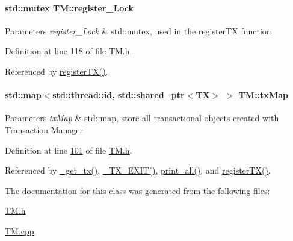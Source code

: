 \paragraph[{\texorpdfstring{register\+\_\+\+Lock}{register_Lock}}]{\setlength{\rightskip}{0pt plus 5cm}std\+::mutex T\+M\+::register\+\_\+\+Lock\hspace{0.3cm}{\ttfamily [private]}}\hypertarget{class_t_m_aeb26546681bfe64e21606b8c012bb8c3_aeb26546681bfe64e21606b8c012bb8c3}{}\label{class_t_m_aeb26546681bfe64e21606b8c012bb8c3_aeb26546681bfe64e21606b8c012bb8c3}

\begin{DoxyParams}{Parameters}
{\em register\+\_\+\+Lock} & std\+::mutex, used in the register\+TX function \\
\hline
\end{DoxyParams}


Definition at line \hyperlink{_t_m_8h_source_l00118}{118} of file \hyperlink{_t_m_8h_source}{T\+M.\+h}.



Referenced by \hyperlink{_t_m_8cpp_source_l00043}{register\+T\+X()}.

\paragraph[{\texorpdfstring{tx\+Map}{txMap}}]{\setlength{\rightskip}{0pt plus 5cm}std\+::map$<$std\+::thread\+::id, std\+::shared\+\_\+ptr$<${\bf TX}$>$ $>$ T\+M\+::tx\+Map\hspace{0.3cm}{\ttfamily [private]}}\hypertarget{class_t_m_a0333dfa193ea99d7626de74a2b932e9b_a0333dfa193ea99d7626de74a2b932e9b}{}\label{class_t_m_a0333dfa193ea99d7626de74a2b932e9b_a0333dfa193ea99d7626de74a2b932e9b}

\begin{DoxyParams}{Parameters}
{\em tx\+Map} & std\+::map, store all transactional objects created with Transaction Manager \\
\hline
\end{DoxyParams}


Definition at line \hyperlink{_t_m_8h_source_l00101}{101} of file \hyperlink{_t_m_8h_source}{T\+M.\+h}.



Referenced by \hyperlink{_t_m_8cpp_source_l00078}{\+\_\+get\+\_\+tx()}, \hyperlink{_t_m_8cpp_source_l00101}{\+\_\+\+T\+X\+\_\+\+E\+X\+I\+T()}, \hyperlink{_t_m_8cpp_source_l00121}{print\+\_\+all()}, and \hyperlink{_t_m_8cpp_source_l00043}{register\+T\+X()}.



The documentation for this class was generated from the following files\+:\begin{DoxyCompactItemize}
\item 
\hyperlink{_t_m_8h}{T\+M.\+h}\item 
\hyperlink{_t_m_8cpp}{T\+M.\+cpp}\end{DoxyCompactItemize}
